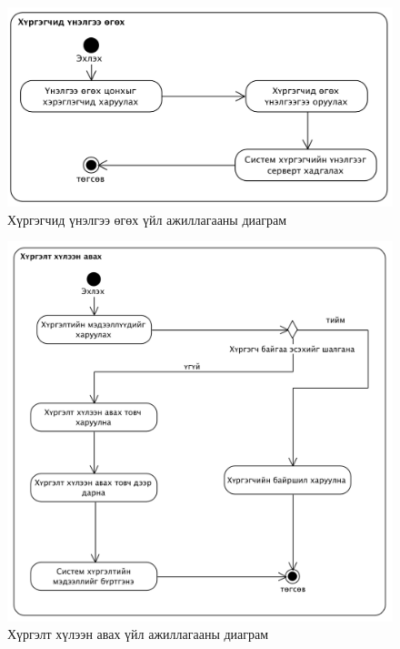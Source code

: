 \begin{figure}[H]
  \centering
	\includegraphics[width=\textwidth]{Figures/shinjilgee/activity/hurgegchid_unelgee_ogoh.png}
	\caption{Хүргэгчид үнэлгээ өгөх үйл ажиллагааны диаграм}
\end{figure}

\begin{figure}[H]
  \centering
	\includegraphics[width=\textwidth]{Figures/shinjilgee/activity/hurgelt_huleen_avah.png}
	\caption{Хүргэлт хүлээн авах үйл ажиллагааны диаграм}
\end{figure}

